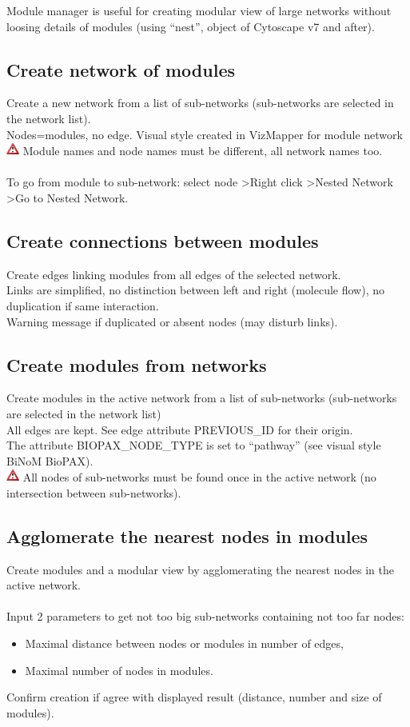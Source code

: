 Module manager is useful for creating modular view of large networks without loosing details of modules (using “nest”, object of Cytoscape v7 and after).
\subsection{Create network of modules}
Create a new network from a list of sub-networks (sub-networks are selected in the network list).\\
Nodes=modules, no edge. Visual style created in VizMapper for module network\\
\includegraphics[width=12pt,height=12pt]{graphics/warning} Module names and node names must be different, all network names too.\\\\
To go from module to sub-network: select node \textgreater Right click \textgreater Nested Network \textgreater Go to Nested Network.
\subsection{Create connections between modules}
Create edges linking modules from all edges of the selected network.\\
Links are simplified, no distinction between left and right (molecule flow), no duplication if same interaction.\\
Warning message if duplicated or absent nodes (may disturb links).
\subsection{Create modules from networks}
Create modules in the active network from a list of sub-networks (sub-networks are selected in the network list)\\
All edges are kept. See edge attribute PREVIOUS\_ID for their origin.\\
The attribute BIOPAX\_NODE\_TYPE is set to “pathway” (see visual style BiNoM BioPAX).\\
\includegraphics[width=12pt,height=12pt]{graphics/warning} All nodes of sub-networks must be found once in the active network (no intersection between sub-networks).
\subsection{Agglomerate the nearest nodes in modules}
Create modules and a modular view by agglomerating the nearest nodes in the active network.\\\\
Input 2 parameters to get not too big sub-networks containing not too far nodes:
\begin{itemize}
\item Maximal distance between nodes or modules in number of edges,
\item Maximal number of nodes in modules.
\end{itemize}
Confirm creation if agree with displayed result (distance, number and size of modules).
